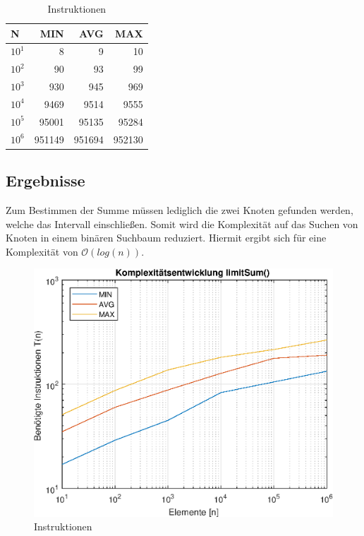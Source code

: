 \documentclass[paper=a4, fontsize=12pt]{article}
\begin{document}
\begin{table}[H]
	\centering
	\begin{tabular}{ l | r | r | r }
		\textbf{N} & \textbf{MIN} & \textbf{AVG} & \textbf{MAX}\\
		\hline\hline
		$10^1$	&	8 & 9 & 10	\\ \hline
		$10^2$	& 90 & 93	& 99	\\ \hline
		$10^3$	& 930 & 945 & 969	\\ \hline
		$10^4$	& 9469 & 9514 & 9555	\\ \hline
		$10^5$	& 95001 & 95135 & 95284	\\ \hline
		$10^6$	& 951149 & 951694	& 952130 \\ \hline
	\end{tabular}
	\caption{Instruktionen }
\end{table}

\subsection{Ergebnisse }
Zum Bestimmen der Summe müssen lediglich die zwei Knoten gefunden werden, welche das Intervall einschließen. Somit wird die Komplexität auf das Suchen von Knoten in einem binären Suchbaum reduziert. Hiermit ergibt sich für  eine Komplexität von $\mathcal{O}(log(n))$.

\begin{figure}[H]
	\centering
	\includegraphics[scale=1]{komplexitaetsentwicklung_limitSum.eps}
	\caption{Instruktionen }
\end{figure}
\end{document}
